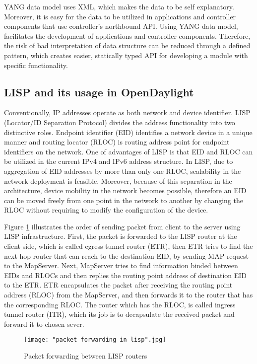 \documentclass[english]{tktltiki2}
\theoremstyle{definition}
\theoremstyle{remark}
\begin{document}
YANG data model uses XML, which makes the data to be self explanatory. Moreover, it is easy for the data to be utilized in applications and controller components that use controller’s northbound API. Using YANG data model, facilitates the development of applications and controller components. Therefore, the risk of bad interpretation of data structure can be reduced through a defined pattern, which creates easier, statically typed API for developing a module with specific functionality. 

\subsection{LISP and its usage in OpenDaylight}

Conventionally, IP addresses operate as both network and device identifier. LISP (Locator/ID Separation Protocol) divides the address functionality into two distinctive roles. Endpoint identifier (EID)  identifies a network device in a unique manner and routing locator (RLOC) is routing address point for endpoint identifiers on the network. One of advantages of LISP is that EID and RLOC can be utilized in the current IPv4 and IPv6 address structure. In LISP, due to aggregation of EID addresses by more than only one RLOC, scalability in the network deployment is feasible. Moreover, because of this separation in the architecture, device mobility in the network becomes possible, therefore an EID can be moved freely from one point in the network to another by changing the RLOC without requiring to modify the configuration of the device. \cite{OKH14}

Figure \ref{fig:LispPacketForwarding} illustrates the order of sending packet from client to the server using LISP infrastructure. First, the packet is forwarded to the LISP router at the client side, which is called egress tunnel router (ETR), then ETR tries to find the next hop router that can reach to the destination EID, by sending MAP request to the MapServer. Next, MapServer tries to find information binded between EIDs and RLOCs and then replies the routing point address of destination EID to the ETR. ETR encapsulates the packet after receiving the routing point address (RLOC) from the MapServer, and then forwards it to the router that has the corresponding RLOC. The router which has the RLOC, is called ingress tunnel router (ITR), which its job is to decapsulate the received packet and forward it to chosen sever. 


\begin{figure}[h!t]
\centering
{}
\texttt{[image: "packet forwarding in lisp".jpg]}
\caption{Packet forwarding between LISP routers \cite{OKH14}}
\label{fig:LispPacketForwarding}
\end{figure}
\end{document}
